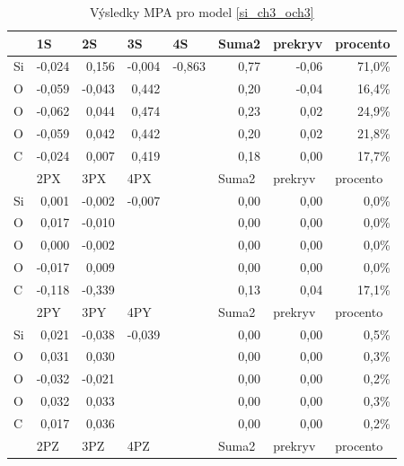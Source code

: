 \documentclass[
  digital, %
  table,   %
  lof,     %
  lot,     %
  oneside,
]{fithesis3}
\begin{document}
\begin{table}[htbp]
\caption{Výsledky MPA pro model  \ref{si_ch3_och3}}
\begin{center}
\begin{tabular}{|l|r|r|l|l|r|r|r|}
\hline
 & \multicolumn{1}{l|}{1S} & \multicolumn{1}{l|}{2S} & 3S & 4S & \multicolumn{1}{l|}{Suma2} & \multicolumn{1}{l|}{prekryv} & \multicolumn{1}{l|}{procento} \\ \hline
Si & -0,024 & 0,156 & \multicolumn{1}{r|}{-0,004} & \multicolumn{1}{r|}{-0,863} & 0,77 & -0,06 & 71,0\% \\ \hline
O & -0,059 & -0,043 & \multicolumn{1}{r|}{0,442} &  & 0,20 & -0,04 & 16,4\% \\ \hline
O & -0,062 & 0,044 & \multicolumn{1}{r|}{0,474} &  & 0,23 & 0,02 & 24,9\% \\ \hline
O & -0,059 & 0,042 & \multicolumn{1}{r|}{0,442} &  & 0,20 & 0,02 & 21,8\% \\ \hline
C & -0,024 & 0,007 & \multicolumn{1}{r|}{0,419} &  & 0,18 & 0,00 & 17,7\% \\ \hline
 & \multicolumn{1}{l|}{2PX} & \multicolumn{1}{l|}{3PX} & 4PX &  & \multicolumn{1}{l|}{Suma2} & \multicolumn{1}{l|}{prekryv} & \multicolumn{1}{l|}{procento} \\ \hline
Si & 0,001 & -0,002 & \multicolumn{1}{r|}{-0,007} &  & 0,00 & 0,00 & 0,0\% \\ \hline
O & 0,017 & -0,010 &  &  & 0,00 & 0,00 & 0,0\% \\ \hline
O & 0,000 & -0,002 &  &  & 0,00 & 0,00 & 0,0\% \\ \hline
O & -0,017 & 0,009 &  &  & 0,00 & 0,00 & 0,0\% \\ \hline
C & -0,118 & -0,339 &  &  & 0,13 & 0,04 & 17,1\% \\ \hline
 & \multicolumn{1}{l|}{2PY} & \multicolumn{1}{l|}{3PY} & 4PY &  & \multicolumn{1}{l|}{Suma2} & \multicolumn{1}{l|}{prekryv} & \multicolumn{1}{l|}{procento} \\ \hline
Si & 0,021 & -0,038 & \multicolumn{1}{r|}{-0,039} &  & 0,00 & 0,00 & 0,5\% \\ \hline
O & 0,031 & 0,030 &  &  & 0,00 & 0,00 & 0,3\% \\ \hline
O & -0,032 & -0,021 &  &  & 0,00 & 0,00 & 0,2\% \\ \hline
O & 0,032 & 0,033 &  &  & 0,00 & 0,00 & 0,3\% \\ \hline
C & 0,017 & 0,036 &  &  & 0,00 & 0,00 & 0,2\% \\ \hline
 & \multicolumn{1}{l|}{2PZ} & \multicolumn{1}{l|}{3PZ} & 4PZ &  & \multicolumn{1}{l|}{Suma2} & \multicolumn{1}{l|}{prekryv} & \multicolumn{1}{l|}{procento} \\ \hline

\end{tabular}
\end{center}
\end{table}
\end{document}
